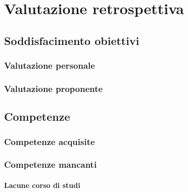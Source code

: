 
\chapter{Valutazione retrospettiva}
\label{cap:valutazione-retrospettiva}

\section{Soddisfacimento obiettivi}
\subsection{Valutazione personale}
\subsection{Valutazione proponente}

\section{Competenze}
\subsection{Competenze acquisite}
\subsection{Competenze mancanti}
\subsubsection{Lacune corso di studi}
